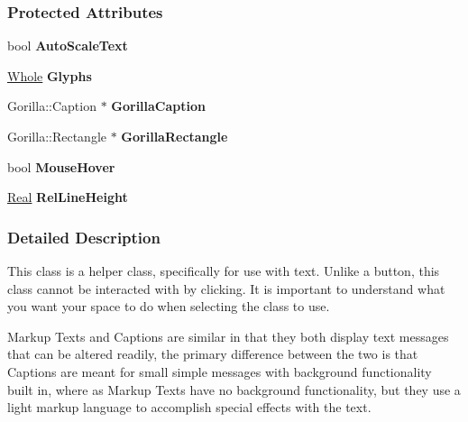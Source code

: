 \subsubsection*{Protected Attributes}
\begin{DoxyCompactItemize}
\item 
\hypertarget{classMezzanine_1_1UI_1_1Caption_a0ffda39b536235d31d11d12b16ddc813}{
bool {\bfseries AutoScaleText}}
\label{classMezzanine_1_1UI_1_1Caption_a0ffda39b536235d31d11d12b16ddc813}

\item 
\hypertarget{classMezzanine_1_1UI_1_1Caption_a7c6b5e3c7cf1bb908903986196e0dbde}{
\hyperlink{namespaceMezzanine_adcbb6ce6d1eb4379d109e51171e2e493}{Whole} {\bfseries Glyphs}}
\label{classMezzanine_1_1UI_1_1Caption_a7c6b5e3c7cf1bb908903986196e0dbde}

\item 
\hypertarget{classMezzanine_1_1UI_1_1Caption_aab382d60acc2efb30bf2c5cb98a8f639}{
Gorilla::Caption $\ast$ {\bfseries GorillaCaption}}
\label{classMezzanine_1_1UI_1_1Caption_aab382d60acc2efb30bf2c5cb98a8f639}

\item 
\hypertarget{classMezzanine_1_1UI_1_1Caption_abb2b4971b8ea93700e5710d4091760b6}{
Gorilla::Rectangle $\ast$ {\bfseries GorillaRectangle}}
\label{classMezzanine_1_1UI_1_1Caption_abb2b4971b8ea93700e5710d4091760b6}

\item 
\hypertarget{classMezzanine_1_1UI_1_1Caption_abb181af71fe2a1f60cca76e5935974bd}{
bool {\bfseries MouseHover}}
\label{classMezzanine_1_1UI_1_1Caption_abb181af71fe2a1f60cca76e5935974bd}

\item 
\hypertarget{classMezzanine_1_1UI_1_1Caption_a2c093e275b717f8e7f7d13d3a78078e1}{
\hyperlink{namespaceMezzanine_a726731b1a7df72bf3583e4a97282c6f6}{Real} {\bfseries RelLineHeight}}
\label{classMezzanine_1_1UI_1_1Caption_a2c093e275b717f8e7f7d13d3a78078e1}

\end{DoxyCompactItemize}


\subsubsection{Detailed Description}
This class is a helper class, specifically for use with text. Unlike a button, this class cannot be interacted with by clicking. It is important to understand what you want your space to do when selecting the class to use. \par
 \par
 Markup Texts and Captions are similar in that they both display text messages that can be altered readily, the primary difference between the two is that Captions are meant for small simple messages with background functionality built in, where as Markup Texts have no background functionality, but they use a light markup language to accomplish special effects with the text. 

